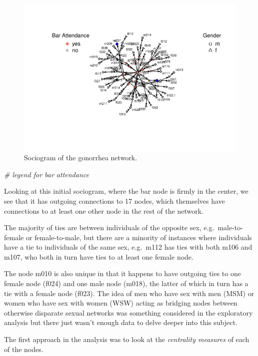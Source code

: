 \documentclass[12pt]{article}
\newenvironment{Shaded}{\begin{snugshade}}{\end{snugshade}}
\newcommand{\CommentTok}[1]{\textcolor[rgb]{0.56,0.35,0.01}{\textit{#1}}}
\begin{document}
\begin{figure}
\centering
\includegraphics{JStevenRaquel-paper_files/figure-latex/sociogram-1.pdf}
\caption{\label{fig:sociogram}Sociogram of the gonorrhea network.}
\end{figure}

\begin{Shaded}
\begin{Highlighting}[]
\CommentTok{\# legend for bar attendance}
\end{Highlighting}
\end{Shaded}

Looking at this initial sociogram, where the bar node is firmly in the center, we see that it has outgoing connections to 17 nodes, which themselves have connections to at least one other node in the rest of the network.

The majority of ties are between individuals of the opposite sex, e.g.~male-to-female or female-to-male, but there are a minority of instances where individuals have a tie to individuals of the same sex, e.g.~m112 has ties with both m106 and m107, who both in turn have ties to at least one female node.

The node m010 is also unique in that it happens to have outgoing ties to one female node (f024) and one male node (m018), the latter of which in turn has a tie with a female node (f023). The idea of men who have sex with men (MSM) or women who have sex with women (WSW) acting as bridging nodes between otherwise disparate sexual networks was something considered in the exploratory analysis but there just wasn't enough data to delve deeper into this subject.

The first approach in the analysis was to look at the \emph{centrality measures} of each of the nodes.
\end{document}
